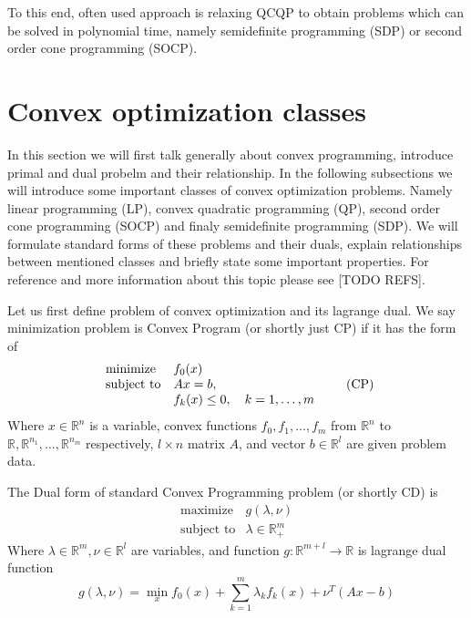 \documentclass[10pt,oneside]{book}
\theoremstyle{definition}
\begin{document}
To this end, often used approach is relaxing QCQP to obtain problems which can be solved in polynomial time, namely semidefinite programming (SDP) or second order cone programming  (SOCP). 

\section{Convex optimization classes}

In this section we will first talk generally about convex programming, introduce primal and dual probelm and their relationship. In the following subsections we will introduce some important classes of convex optimization problems. Namely linear programming (LP), convex quadratic programming (QP), second order cone programming (SOCP) and finaly semidefinite programming (SDP). 
We will formulate standard forms of these problems and their duals, explain relationships between mentioned classes and briefly state some important properties. For reference and more information about this topic please see [TODO REFS].


Let us first define problem of convex optimization and its lagrange dual.
 We say minimization problem is Convex Program (or shortly just CP) if it has the form of
\label{defCP}
\begin{equation}
\label{CP}
\begin{array}{ll}
\mbox{\rm minimize} & f_0(x) \\
\mbox{\rm subject to}& Ax = b ,  \\
& f_k(x)\leq 0 , \ \ \ k = 1,\dots, m  \\
\end{array} 
\tag{CP}
\end{equation}
Where $x\in \mathbb{R}^n $ is a variable, convex functions $f_0,f_1,\dots ,f_m$ from $\mathbb{R}^n$ to  \\$\mathbb{R},\mathbb{R}^{n_1},\dots ,\mathbb{R}^{n_m}$ respectively, $l\times n$ matrix $A$, and vector $b\in \mathbb{R}^{l}$ are given problem data.

The Dual form of standard Convex Programming problem (or shortly CD) is 
\begin{equation}
\label{CD}
\begin{array}{ll}
\mbox{maximize} & g(\lambda,\nu) \\
\mbox{subject to}& \lambda \in \mathbb{R}^m_+
\end{array} 
\tag{CD}
\end{equation}
Where $\lambda \in \mathbb{R}^m , \nu \in \mathbb{R}^l$ are variables, and function $g: \mathbb{R}^{m+l}\rightarrow \mathbb{R}$ is lagrange dual function 
\begin{equation}
g(\lambda,\nu) = \min_x f_0(x) + \sum_{k=1}^m \lambda_k f_k(x) + \nu^T(Ax-b)
\end{equation}
\end{document}
